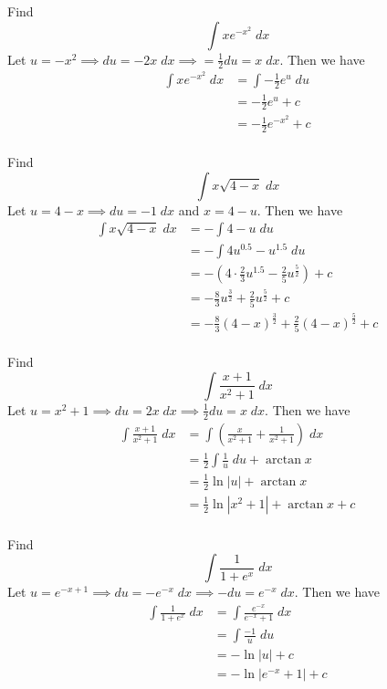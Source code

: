 \documentclass{article}
\begin{document}
  \begin{example}
    Find \[
      \int xe^{-x^2} \; dx
    \]
    Let $u = -x^2 \implies du = -2x \; dx \implies =\frac{1}{2} du = x \; dx$. Then we have
    \begin{align*}
      \int xe^{-x^2} \; dx &= \int -\frac{1}{2}e^u \; du\\
      &= -\frac{1}{2} e^u + c\\
      &= -\frac{1}{2}e^{-x^2} + c\\
    \end{align*}
  \end{example}
  \begin{example}
    Find \[
      \int x\sqrt{4-x} \; dx
    \]
    Let $u = 4-x \implies du = -1 \; dx$ and $x = 4 - u$. Then we have
    \begin{align*}
      \int x\sqrt{4-x} \; dx &= -\int 4 - u \; du\\
      &= -\int 4u^{0.5} - u^{1.5} \; du\\
      &= -(4\cdot \frac{2}{3}u^{1.5} - \frac{2}{5}u^\frac{5}{2}) + c\\
      &= -\frac{8}{3}u^\frac{3}{2} + \frac{2}{5}u^\frac{5}{2} + c\\
      &= -\frac{8}{3}(4-x)^\frac{3}{2} + \frac{2}{5}(4-x)^\frac{5}{2} + c\\
    \end{align*}
  \end{example}
  \begin{example}
    Find \[
      \int \frac{x+1}{x^2 + 1} \; dx
    \]
    Let $u = x^2 + 1 \implies du = 2x \; dx \implies \frac{1}{2} du = x \; dx$. Then we have
    \begin{align*}
      \int \frac{x+1}{x^2 + 1} \; dx &= \int \left(\frac{x}{x^2 + 1} + \frac{1}{x^2 + 1}\right) \; dx\\
      &= \frac{1}{2} \int\frac{1}{u} \; du + \arctan x\\
      &= \frac{1}{2} \ln |u| + \arctan x\\
      &= \frac{1}{2} \ln |x^2 + 1| + \arctan x + c\\
    \end{align*}
  \end{example}
  \begin{example}
    Find \[
      \int \frac{1}{1 + e^x} \; dx
    \]
    Let $u = e^{-x+1} \implies du = -e^{-x} \; dx \implies -du = e^{-x} \; dx$. Then we have
    \begin{align*}
      \int \frac{1}{1 + e^x} \; dx &= \int \frac{e^{-x}}{e^{-x} + 1} \; dx\\
      &= \int\frac{-1}{u} \; du\\
      &= -\ln |u| + c\\
      &= -\ln|e^{-x} + 1| + c\\
    \end{align*}
  \end{example}
\end{document}
